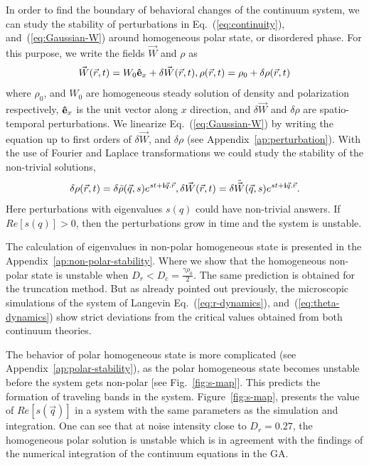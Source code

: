 \documentclass[reprint,floatfix,amsmath,amssymb,aps,pre,showkeys,showpacs,superscriptaddress]{revtex4-1}
\newcommand{\e}{{\bf \hat{e}}}
\newcommand{\im}{{\rm \bf i}}
\newcommand{\w}{W}
\newcommand{\vw}{\vec{\w}}
\newcommand{\req}[1]{Eq.~(\ref{#1})}
\newcommand{\reqs}[2]{Eq.~(\ref{#1}), and~(\ref{#2})}
\begin{document}
In order to find the boundary of behavioral changes of the continuum system, we can study the stability of perturbations in \reqs{eq:continuity}{eq:Gaussian-W} around homogeneous polar state, or disordered phase. For this purpose, we write the fields $\vw$ and $\rho$ as
\begin{equation}
\vw(\vec{r},t) = \w_0 \e_x + \delta \vw(\vec{r},t), \rho(\vec{r},t) = \rho_0 + \delta \rho(\vec{r},t)
\end{equation}
where $\rho_0$, and $\w_0$ are homogeneous steady solution of density and polarization respectively, $\e_x$ is the unit vector along $x$ direction, and $\delta \vw$ and $\delta \rho$ are spatio-temporal perturbations. We linearize \req{eq:Gaussian-W} by writing the equation up to first orders of $\delta \vw$, and $\delta \rho$ (see Appendix~\ref{ap:perturbation}). With the use of Fourier and Laplace transformations we could study the stability of the non-trivial solutions,
\begin{equation}
\delta \rho(\vec{r},t) = \delta \tilde{\rho}(\vec{q},s) e^{st + \im \vec{q}.\vec{r}}, \delta \vw(\vec{r},t) = \delta \tilde{\vw}(\vec{q},s) e^{st + \im \vec{q}.\vec{r}}.
\end{equation}
Here perturbations with eigenvalues $s(q)$ could have non-trivial answers. If $Re[s(q)] > 0$, then the perturbations grow in time and the system is unstable.

The calculation of eigenvalues in non-polar homogeneous state is presented in the Appendix~\ref{ap:non-polar-stability}. Where we show that the homogeneous non-polar state is unstable when $D_r < D_c = \frac{\gamma \rho_0}{2}$. The same prediction is obtained for the truncation method. But as already pointed out previously, the microscopic simulations of the system of  Langevin \reqs{eq:r-dynamics}{eq:theta-dynamics} show strict deviations from the critical values obtained from both continuum theories.

The behavior of polar homogeneous state is more complicated (see Appendix~\ref{ap:polar-stability}), as the polar homogeneous state becomes unstable before the system gets non-polar [see Fig.~\ref{fig:s-map}]. This predicts the formation of traveling bands in the system. Figure~\ref{fig:s-map}, presents the value of $Re[s(\vec{q})]$ in a system with the same parameters as the simulation and integration. One can see that at noise intensity close to $D_r=0.27$, the homogeneous polar solution is unstable which is in agreement with the findings of the numerical integration of the continuum equations in the GA.
\end{document}
